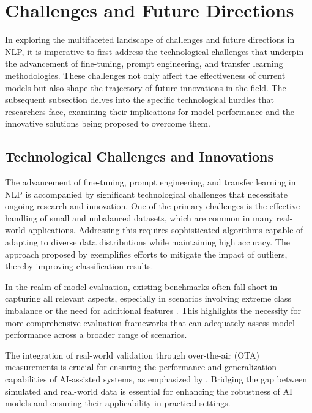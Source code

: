 \section{Challenges and Future Directions} \label{sec:Challenges and Future Directions}

In exploring the multifaceted landscape of challenges and future directions in NLP, it is imperative to first address the technological challenges that underpin the advancement of fine-tuning, prompt engineering, and transfer learning methodologies. These challenges not only affect the effectiveness of current models but also shape the trajectory of future innovations in the field. The subsequent subsection delves into the specific technological hurdles that researchers face, examining their implications for model performance and the innovative solutions being proposed to overcome them.






\subsection{Technological Challenges and Innovations} \label{subsec:Technological Challenges and Innovations}

The advancement of fine-tuning, prompt engineering, and transfer learning in NLP is accompanied by significant technological challenges that necessitate ongoing research and innovation. One of the primary challenges is the effective handling of small and unbalanced datasets, which are common in many real-world applications. Addressing this requires sophisticated algorithms capable of adapting to diverse data distributions while maintaining high accuracy. The approach proposed by \cite{peiris2021deeplearningnonsmoothobjectives} exemplifies efforts to mitigate the impact of outliers, thereby improving classification results.

In the realm of model evaluation, existing benchmarks often fall short in capturing all relevant aspects, especially in scenarios involving extreme class imbalance or the need for additional features \cite{m2023comparativeanalysisimbalancedmalware}. This highlights the necessity for more comprehensive evaluation frameworks that can adequately assess model performance across a broader range of scenarios.

The integration of real-world validation through over-the-air (OTA) measurements is crucial for ensuring the performance and generalization capabilities of AI-assisted systems, as emphasized by \cite{luostari2024adaptingrealityovertheairvalidation}. Bridging the gap between simulated and real-world data is essential for enhancing the robustness of AI models and ensuring their applicability in practical settings.

